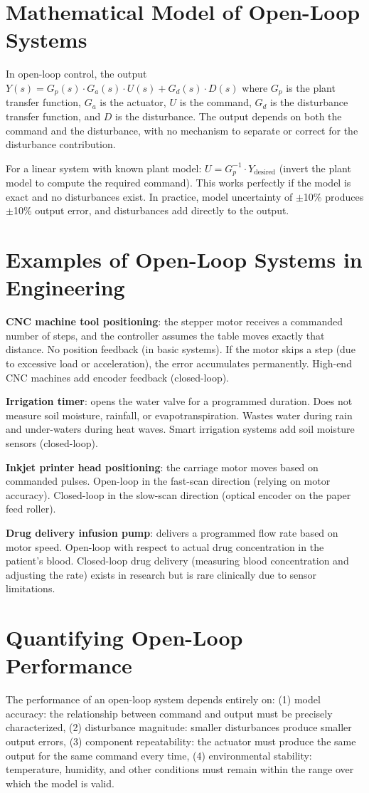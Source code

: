 \documentclass[11pt,letterpaper,twoside,openany]{book}
\begin{document}
\section{Mathematical Model of Open-Loop Systems}
In open-loop control, the output $Y(s) = G_p(s) \cdot G_a(s) \cdot U(s) + G_d(s) \cdot D(s)$ where $G_p$ is the plant transfer function, $G_a$ is the actuator, $U$ is the command, $G_d$ is the disturbance transfer function, and $D$ is the disturbance. The output depends on both the command and the disturbance, with no mechanism to separate or correct for the disturbance contribution.

For a linear system with known plant model: $U = G_p^{-1} \cdot Y_{\text{desired}}$ (invert the plant model to compute the required command). This works perfectly if the model is exact and no disturbances exist. In practice, model uncertainty of $\pm$10\% produces $\pm$10\% output error, and disturbances add directly to the output.

\section{Examples of Open-Loop Systems in Engineering}
\textbf{CNC machine tool positioning}: the stepper motor receives a commanded number of steps, and the controller assumes the table moves exactly that distance. No position feedback (in basic systems). If the motor skips a step (due to excessive load or acceleration), the error accumulates permanently. High-end CNC machines add encoder feedback (closed-loop).

\textbf{Irrigation timer}: opens the water valve for a programmed duration. Does not measure soil moisture, rainfall, or evapotranspiration. Wastes water during rain and under-waters during heat waves. Smart irrigation systems add soil moisture sensors (closed-loop).

\textbf{Inkjet printer head positioning}: the carriage motor moves based on commanded pulses. Open-loop in the fast-scan direction (relying on motor accuracy). Closed-loop in the slow-scan direction (optical encoder on the paper feed roller).

\textbf{Drug delivery infusion pump}: delivers a programmed flow rate based on motor speed. Open-loop with respect to actual drug concentration in the patient's blood. Closed-loop drug delivery (measuring blood concentration and adjusting the rate) exists in research but is rare clinically due to sensor limitations.

\section{Quantifying Open-Loop Performance}
The performance of an open-loop system depends entirely on: (1) model accuracy: the relationship between command and output must be precisely characterized, (2) disturbance magnitude: smaller disturbances produce smaller output errors, (3) component repeatability: the actuator must produce the same output for the same command every time, (4) environmental stability: temperature, humidity, and other conditions must remain within the range over which the model is valid.
\end{document}
